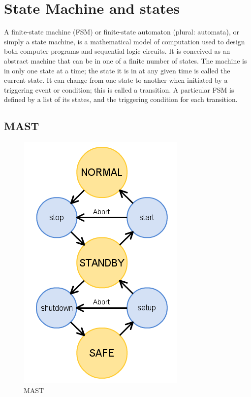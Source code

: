 \documentclass[12pt,a4paper]{report}
\begin{document}
\section{State Machine and states}
A finite-state machine (FSM) or finite-state automaton (plural: automata), or simply a state machine, is a mathematical model of computation used to design both computer programs and sequential logic circuits. It is conceived as an abstract machine that can be in one of a finite number of states. The machine is in only one state at a time; the state it is in at any given time is called the current state. It can change from one state to another when initiated by a triggering event or condition; this is called a transition. A particular FSM is defined by a list of its states, and the triggering condition for each transition.\cite{state_machine}

\subsection{MAST}
\begin{figure}
	\begin{center}
		\includegraphics[scale=0.5]{mast.png}
	\caption{MAST}
	\end{center}
	\vspace{-100pt}
\end{figure}
\end{document}
